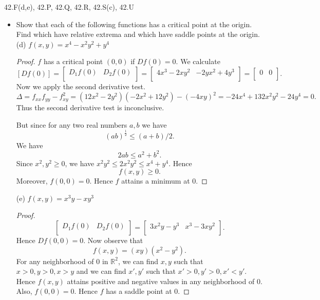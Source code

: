 42.F(d,e), 42.P, 42.Q, 42.R, 42.S(c), 42.U

\begin{itemize}
	\item [42.F.] Show that each of the following functions has a critical point at the origin. Find which have relative extrema and which have saddle points at the origin.\\
(d) $f(x, y)=x^4-x^2 y^2+y^4$
\begin{proof}
	$f$ has a critical point $(0,0)$ if $Df(0) = 0$. We calculate
	 \[
		 \left[ Df(0) \right] = 
		\begin{bmatrix}
			D_1 f(0) & D_2 f(0) \\
		\end{bmatrix}
		=
		\begin{bmatrix}
			4x^3 - 2xy^2 & -2yx^2 + 4y^3 \\
		\end{bmatrix}
		= 
		\begin{bmatrix}
			0 & 0 \\
		\end{bmatrix}
	.\] 
	Now we apply the second derivative test.
	\[
		\Delta = f_{x x} f_{y y} - f^2_{x y} = (12x^2-2y^2)(-2x^2+12y^2) - (-4xy)^2 = -24 x^{4}+132 x^{2} y^{2}-24 y^{4} = 0	
	.\] 
	Thus the second derivative test is inconclusive. 

	But since for any two real numbers $a,b$ we have
	\[
		(ab)^{\frac{1}{2}} \le \left( a+b \right) /2
	.\] 
	We have
	\[
		2 ab \le a^2 + b^2
	.\] 
	Since $x^2, y^2 \ge 0$, we have $x^2 y^2 \le 2x^2 y^2 \le x^4 + y^4$. Hence
	\[
		f(x,y) \ge 0
	.\] 
	Moreover, $f(0,0) = 0$.
	Hence $f$ attains a minimum at $0$.
\end{proof}

(e) $f(x, y)=x^3 y-x y^3$
\begin{proof}
	\[
		\begin{bmatrix}
			D_1f\left( 0 \right)  & D_2f(0) \\
		\end{bmatrix}
		=
		\begin{bmatrix}
			3x^2y-y^3 & x^3-3xy^2 \\
		\end{bmatrix}
	.\] 
	Hence $Df(0,0) = 0$. Now observe that
	\[
		f(x,y) = (xy) (x^2 - y^2)
	.\] 
	For any neighborhood of  $0$ in $\mathbb{R}^2$, we can find $x,y$ such that $x>0, y>0, x>y$ and we can find $x',y'$ such that $x'>0, y'>0, x'<y'$. Hence $f(x,y)$ attains positive and negative values in any neighborhood of $0$. Also, $f(0,0) = 0$. Hence $f$ has a saddle point at $0$.
\end{proof}


\end{itemize}
